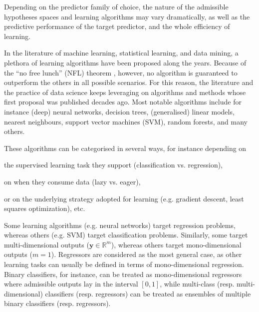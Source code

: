 \documentclass[12pt,a4paper,openright,twoside]{book}
\begin{document}
Depending on the predictor family of choice, the nature of the admissible hypotheses spaces and learning algorithms may vary dramatically, as well as the predictive performance of the target predictor, and the whole efficiency of learning.

In the literature of machine learning, statistical learning, and data mining, a plethora of learning algorithms have been proposed along the years.
%
Because of the ``no free lunch'' (NFL) theorem \cite{DolpertM97}, however, no algorithm is guaranteed to outperform the others in all possible scenarios.
%
For this reason, the literature and the practice of data science keeps leveraging on algorithms and methods whose first proposal was published decades ago.
%
Most notable algorithms include for instance (deep) neural networks, decision trees, (generalised) linear models, nearest neighbours, support vector machines (SVM), random forests, and many others.

These algorithms can be categorised in several ways, for instance depending on
%
\begin{inlinelist}
    \item the supervised learning task they support (classification vs. regression),
    \item on when they consume data (lazy vs. eager),
    \item or on the underlying strategy adopted for learning (e.g. gradient descent, least squares optimization), etc.
\end{inlinelist}


Some learning algorithms (e.g. neural networks) target regression problems, whereas others (e.g. SVM) target classification problems.
%
Similarly, some target multi-dimensional outputs ($\mathbf{y} \in \mathbb{R}^m$), whereas others target mono-dimensional outputs ($m = 1$).
%
Regressors are considered as the most general case, as other learning tasks can usually be defined in terms of mono-dimensional regression.
%
Binary classifiers, for instance, can be treated as mono-dimensional regressors where admissible outputs lay in the interval $[0, 1]$, while multi-class (resp. multi-dimensional) classifiers (resp. regressors) can be treated as ensembles of multiple binary classifiers (resp. regressors).
\end{document}

